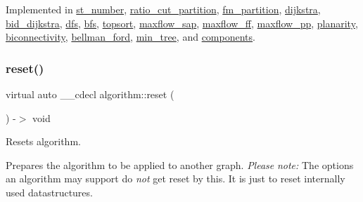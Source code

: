 Implemented in \mbox{\hyperlink{classst__number_a2aad4550b821c52d6998bff35fd8648f}{st\+\_\+number}}, \mbox{\hyperlink{classratio__cut__partition_aae4e0e3f2758ecb191807e3bef605f81}{ratio\+\_\+cut\+\_\+partition}}, \mbox{\hyperlink{classfm__partition_a2fadbf126742f659878132159653e102}{fm\+\_\+partition}}, \mbox{\hyperlink{classdijkstra_aec2427139f1e69d358153362a99257ba}{dijkstra}}, \mbox{\hyperlink{classbid__dijkstra_a908a240370d578fbd6bf54b4ab09d391}{bid\+\_\+dijkstra}}, \mbox{\hyperlink{classdfs_a1af70060897529e67910f589b047e576}{dfs}}, \mbox{\hyperlink{classbfs_a57bc562775d63c4bbec63ee403e0fde7}{bfs}}, \mbox{\hyperlink{classtopsort_a777a9a68c4081d22e7b698ed3c515343}{topsort}}, \mbox{\hyperlink{classmaxflow__sap_acc6035b666d6db078ef1442ac847bd74}{maxflow\+\_\+sap}}, \mbox{\hyperlink{classmaxflow__ff_ac1ae43b4e24d9b433892c073c8b244d3}{maxflow\+\_\+ff}}, \mbox{\hyperlink{classmaxflow__pp_a1535468f547b80ea750432f5e27c338d}{maxflow\+\_\+pp}}, \mbox{\hyperlink{classplanarity_ae06c471d957a116aad14e338c341f8b1}{planarity}}, \mbox{\hyperlink{classbiconnectivity_a372daa6b7897a5b284ee4695584ca81c}{biconnectivity}}, \mbox{\hyperlink{classbellman__ford_a7aadad38ac3fcccc8dee69896e183ccc}{bellman\+\_\+ford}}, \mbox{\hyperlink{classmin__tree_ad87b1bfbc687ad943c07538fa0c3d270}{min\+\_\+tree}}, and \mbox{\hyperlink{classcomponents_aeeda901d02c65d6c31c8b6148540d7c1}{components}}.

\mbox{\label{classalgorithm_aea645f2e39976a477c8f8564656fd1b6}} 
\subsubsection{\texorpdfstring{reset()}{reset()}}
{\footnotesize\ttfamily virtual auto \+\_\+\+\_\+cdecl algorithm\+::reset (\begin{DoxyParamCaption}{ }\end{DoxyParamCaption}) -\/$>$  void\hspace{0.3cm}{\ttfamily [pure virtual]}}



Resets algorithm. 

Prepares the algorithm to be applied to another graph. {\itshape Please} {\itshape note\+:} The options an algorithm may support do {\itshape not} get reset by this. It is just to reset internally used datastructures. 


